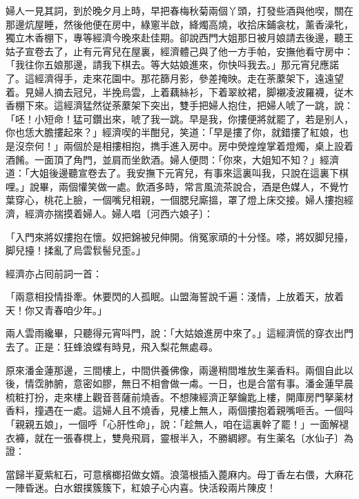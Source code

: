 婦人一見其詞，到於晚夕月上時，早把春梅秋菊兩個丫頭，打發些酒與他喫，關在那邊炕屋睡，然後他便在房中，綠窻半啟，絳燭高燒，收拾床鋪衾枕，薰香澡牝，獨立木香棚下，專等經濟今晚來赴佳期。卻說西門大姐那日被月娘請去後邊，聽王姑子宣卷去了，止有元宵兒在屋裏，經濟體己與了他一方手帕，安撫他看守房中：「我往你五娘那邊，請我下棋去。等大姑娘進來，你快呌我去。」那元宵兒應諾了。這經濟得手，走來花園中。那花篩月影，參差掩映。走在荼䕷架下，遠遠望着。見婦人摘去冠兒，半挽烏雲，上着藕絲衫，下着翠紋裙，脚襯凌波羅襪，従木香棚下來。這經濟猛然従荼䕷架下突出，雙手把婦人抱住，把婦人唬了一跳，說：「呸！小短命！猛可鑽出來，唬了我一跳。早是我，你摟便將就罷了，若是别人，你也恁大膽摟起來？」經濟喫的半酣兒，笑道：「早是摟了你，就錯摟了紅娘，也是沒奈何！」兩個於是相摟相抱，擕手進入房中。房中熒煌煌掌着燈燭，桌上設着酒餚。一面頂了角門，並肩而坐飲酒。婦人便問：「你來，大姐知不知？」經濟道：「大姐後邊聽宣卷去了。我安撫下元宵兒，有事來這裏叫我，只說在這裏下棋哩。」說畢，兩個懽笑做一處。飲酒多時，常言風流茶說合，酒是色媒人，不覺竹葉穿心，桃花上臉，一個嘴兒相親，一個腮兒廝搵，罩了燈上床交接。婦人摟抱經濟，經濟亦揣摸着婦人。婦人唱〔河西六娘子〕：

\begin{myquote}
「入門來將奴摟抱在懷。奴把錦被兒伸開。俏冤家頑的十分怪。嗏，將奴脚兒擡，脚兒擡！揉亂了烏雲䯼髻兒歪。」
\end{myquote}

經濟亦占囘前詞一首：

\begin{myquote}
「兩意相投情掛牽。休要閃的人孤眠。山盟海誓說千遍：淺情，上放着天，放着天！你又青春咱少年。」
\end{myquote}

兩人雲雨纔畢，只聽得元宵呌門，說：「大姑娘進房中來了。」這經濟慌的穿衣出門去了。正是：狂蜂浪蝶有時見，飛入梨花無處尋。

原來潘金蓮那邊，三間樓上，中間供養佛像，兩邊稍間堆放生薬香料。兩個自此以後，情霑肺腑，意密如膠，無日不相會做一䖏。一日，也是合當有事。潘金蓮早晨梳粧打扮，走來樓上觀音菩薩前燒香。不想陳經濟正拏鑰匙上樓，開庫房門拏薬材香料，撞遇在一處。這婦人且不燒香，見樓上無人，兩個摟抱着親嘴咂舌。一個呌「親親五娘」，一個呼「心肝性命」，說：「趁無人，咱在這裏幹了罷！」一面解褪衣褲，就在一張春櫈上，雙鳧飛肩，靈根半入，不勝綢繆。有生薬名〔水仙子〕為證：

\begin{myquote}
當歸半夏紫紅石，可意檳榔招做女婿。浪蕩根插入蓖麻内。母丁香左右偎，大麻花一陣昏迷。白水銀撲簇簇下，紅娘子心内喜。快活殺兩片陳皮！
\end{myquote}

